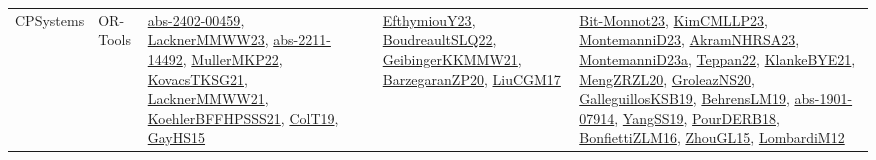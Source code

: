 {\begin{longtable}{lp{3cm}>{\raggedright}p{6cm}>{\raggedright}p{6cm}p{8cm}}
CPSystems & OR-Tools & \href{articles/abs-2402-00459.pdf}{abs-2402-00459}\cite{abs-2402-00459}, \href{articles/LacknerMMWW23.pdf}{LacknerMMWW23}\cite{LacknerMMWW23}, \href{articles/abs-2211-14492.pdf}{abs-2211-14492}\cite{abs-2211-14492}, \href{articles/MullerMKP22.pdf}{MullerMKP22}\cite{MullerMKP22}, \href{papers/KovacsTKSG21.pdf}{KovacsTKSG21}\cite{KovacsTKSG21}, \href{papers/LacknerMMWW21.pdf}{LacknerMMWW21}\cite{LacknerMMWW21}, \href{articles/KoehlerBFFHPSSS21.pdf}{KoehlerBFFHPSSS21}\cite{KoehlerBFFHPSSS21}, \href{papers/ColT19.pdf}{ColT19}\cite{ColT19}, \href{papers/GayHS15.pdf}{GayHS15}\cite{GayHS15} & \href{papers/EfthymiouY23.pdf}{EfthymiouY23}\cite{EfthymiouY23}, \href{papers/BoudreaultSLQ22.pdf}{BoudreaultSLQ22}\cite{BoudreaultSLQ22}, \href{papers/GeibingerKKMMW21.pdf}{GeibingerKKMMW21}\cite{GeibingerKKMMW21}, \href{papers/BarzegaranZP20.pdf}{BarzegaranZP20}\cite{BarzegaranZP20}, \href{papers/LiuCGM17.pdf}{LiuCGM17}\cite{LiuCGM17} & \href{papers/Bit-Monnot23.pdf}{Bit-Monnot23}\cite{Bit-Monnot23}, \href{papers/KimCMLLP23.pdf}{KimCMLLP23}\cite{KimCMLLP23}, \href{articles/MontemanniD23.pdf}{MontemanniD23}\cite{MontemanniD23}, \href{articles/AkramNHRSA23.pdf}{AkramNHRSA23}\cite{AkramNHRSA23}, \href{articles/MontemanniD23a.pdf}{MontemanniD23a}\cite{MontemanniD23a}, \href{papers/Teppan22.pdf}{Teppan22}\cite{Teppan22}, \href{papers/KlankeBYE21.pdf}{KlankeBYE21}\cite{KlankeBYE21}, \href{articles/MengZRZL20.pdf}{MengZRZL20}\cite{MengZRZL20}, \href{papers/GroleazNS20.pdf}{GroleazNS20}\cite{GroleazNS20}, \href{papers/GalleguillosKSB19.pdf}{GalleguillosKSB19}\cite{GalleguillosKSB19}, \href{papers/BehrensLM19.pdf}{BehrensLM19}\cite{BehrensLM19}, \href{articles/abs-1901-07914.pdf}{abs-1901-07914}\cite{abs-1901-07914}, \href{papers/YangSS19.pdf}{YangSS19}\cite{YangSS19}, \href{articles/PourDERB18.pdf}{PourDERB18}\cite{PourDERB18}, \href{papers/BonfiettiZLM16.pdf}{BonfiettiZLM16}\cite{BonfiettiZLM16}, \href{papers/ZhouGL15.pdf}{ZhouGL15}\cite{ZhouGL15}, \href{articles/LombardiM12.pdf}{LombardiM12}\cite{LombardiM12}\\

\end{longtable}}
